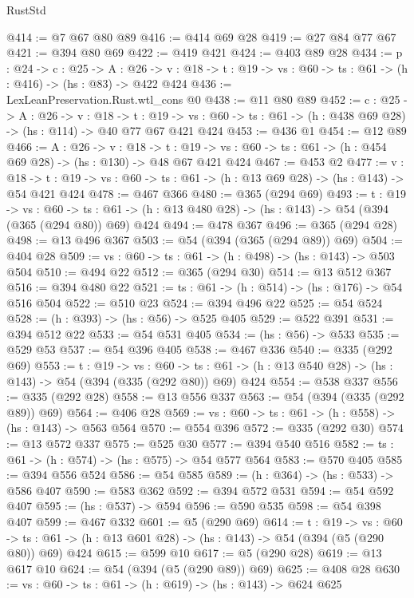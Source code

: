 \begin{lexlean}{RustStd}
\begin{coremodule}
{\begin{coremodule}
{{{{{{{{@414 := @7 @67 @80 @89
@416 := @414 @69 @28
@419 := @27 @84 @77 @67
@421 := @394 @80 @69
@422 := @419 @421
@424 := @403 @89 @28
@434 := {p : @24} ->
  {c : @25} ->
  {A : @26} ->
  {v : @18} -> {t : @19} -> {vs : @60} -> {ts : @61} -> (h : @416) -> (hs : @83) -> @422 @424
@436 := LexLeanPreservation.Rust.wtl_cons @0
@438 := @11 @80 @89
@452 := {c : @25} ->
  {A : @26} ->
  {v : @18} ->
  {t : @19} ->
  {vs : @60} -> {ts : @61} -> (h : @438 @69 @28) -> (hs : @114) -> @40 @77 @67 @421 @424
@453 := @436 @1
@454 := @12 @89
@466 := {A : @26} ->
  {v : @18} ->
  {t : @19} -> {vs : @60} -> {ts : @61} -> (h : @454 @69 @28) -> (hs : @130) -> @48 @67 @421 @424
@467 := @453 @2
@477 := {v : @18} ->
  {t : @19} -> {vs : @60} -> {ts : @61} -> (h : @13 @69 @28) -> (hs : @143) -> @54 @421 @424
@478 := @467 @366
@480 := @365 (@294 @69)
@493 := {t : @19} ->
  {vs : @60} ->
  {ts : @61} -> (h : @13 @480 @28) -> (hs : @143) -> @54 (@394 (@365 (@294 @80)) @69) @424
@494 := @478 @367
@496 := @365 (@294 @28)
@498 := @13 @496 @367
@503 := @54 (@394 (@365 (@294 @89)) @69)
@504 := @404 @28
@509 := {vs : @60} -> {ts : @61} -> (h : @498) -> (hs : @143) -> @503 @504
@510 := @494 @22
@512 := @365 (@294 @30)
@514 := @13 @512 @367
@516 := @394 @480 @22
@521 := {ts : @61} -> (h : @514) -> (hs : @176) -> @54 @516 @504
@522 := @510 @23
@524 := @394 @496 @22
@525 := @54 @524
@528 := (h : @393) -> (hs : @56) -> @525 @405
@529 := @522 @391
@531 := @394 @512 @22
@533 := @54 @531 @405
@534 := (hs : @56) -> @533
@535 := @529 @53
@537 := @54 @396 @405
@538 := @467 @336
@540 := @335 (@292 @69)
@553 := {t : @19} ->
  {vs : @60} ->
  {ts : @61} -> (h : @13 @540 @28) -> (hs : @143) -> @54 (@394 (@335 (@292 @80)) @69) @424
@554 := @538 @337
@556 := @335 (@292 @28)
@558 := @13 @556 @337
@563 := @54 (@394 (@335 (@292 @89)) @69)
@564 := @406 @28
@569 := {vs : @60} -> {ts : @61} -> (h : @558) -> (hs : @143) -> @563 @564
@570 := @554 @396
@572 := @335 (@292 @30)
@574 := @13 @572 @337
@575 := @525 @30
@577 := @394 @540 @516
@582 := {ts : @61} -> (h : @574) -> (hs : @575) -> @54 @577 @564
@583 := @570 @405
@585 := @394 @556 @524
@586 := @54 @585
@589 := (h : @364) -> (hs : @533) -> @586 @407
@590 := @583 @362
@592 := @394 @572 @531
@594 := @54 @592 @407
@595 := (hs : @537) -> @594
@596 := @590 @535
@598 := @54 @398 @407
@599 := @467 @332
@601 := @5 (@290 @69)
@614 := {t : @19} ->
  {vs : @60} ->
  {ts : @61} -> (h : @13 @601 @28) -> (hs : @143) -> @54 (@394 (@5 (@290 @80)) @69) @424
@615 := @599 @10
@617 := @5 (@290 @28)
@619 := @13 @617 @10
@624 := @54 (@394 (@5 (@290 @89)) @69)
@625 := @408 @28
@630 := {vs : @60} -> {ts : @61} -> (h : @619) -> (hs : @143) -> @624 @625
}}}}}}}}
\end{coremodule}}
\end{coremodule}
\end{lexlean}
